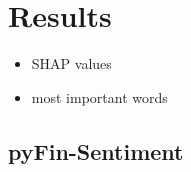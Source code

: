 \section{Results}


\begin{itemize}[noitemsep]
	\item SHAP values
	\item most important words
\end{itemize}

\subsection{pyFin-Sentiment}